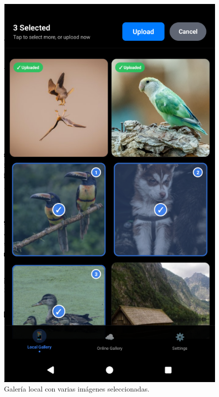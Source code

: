 \begin{figure}[H]
\begin{minipage}[t]{0.3\textwidth}
    \includegraphics[width=\textwidth]{assets/local-gallery-selected-mobile.png}
    \caption{Galería local con varias imágenes seleccionadas.}
    \label{fig:local-gallery-selected-mobile}
  \end{minipage}
  \hfill
  \begin{minipage}[t]{0.3\textwidth}
    \centering

\end{minipage}
\end{figure}
